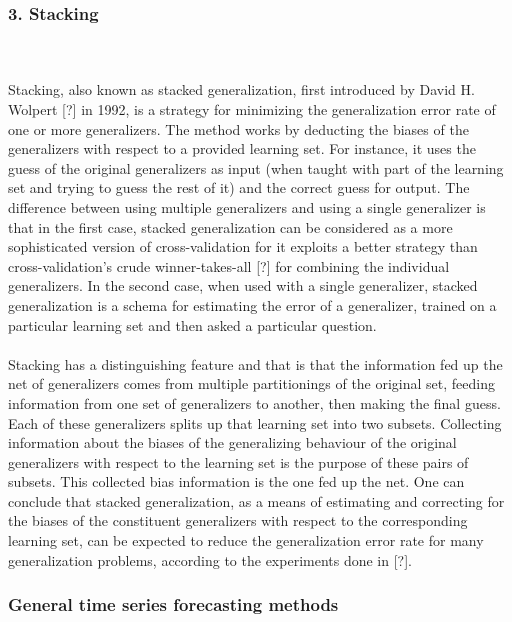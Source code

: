 \documentclass[runningheads,a4paper]{llncs}[2015/06/24]
\begin{document}
\subsubsection{3. Stacking}
\hspace{1cm}\\\\ Stacking, also known as stacked generalization, first introduced by David H. Wolpert [?] in 1992, is a strategy for minimizing the generalization error rate of one or more generalizers. The method works by deducting the biases of the generalizers with respect to a provided learning set. For instance, it uses the guess of the original generalizers as input (when taught with part of the learning set and trying to guess the rest of it) and the correct guess for output. The difference between using multiple generalizers and using a single generalizer is that in the first case, stacked generalization can be considered as a more sophisticated version of cross-validation for it exploits a better strategy than cross-validation's crude winner-takes-all [?] for combining the individual generalizers. In the second case, when used with a single generalizer, stacked generalization is a schema for estimating the error of a generalizer, trained on a particular learning set and then asked a particular question. \\\\Stacking has a distinguishing feature and that is that the information fed up the net of generalizers comes from multiple partitionings of the original set, feeding information from one set of generalizers to another, then making the final guess. Each of these generalizers splits up that learning set into two subsets. Collecting information about the biases of the generalizing behaviour of the original generalizers with respect to the learning set is the purpose of these pairs of subsets. This collected bias information is the one fed up the net. One can conclude that stacked generalization, as a means of estimating and correcting for the biases of the constituent generalizers with respect to the corresponding learning set, can be expected to reduce the generalization error rate for many generalization problems, according to the experiments done in [?].
		 
		\subsubsection{General time series forecasting methods}
\end{document}
